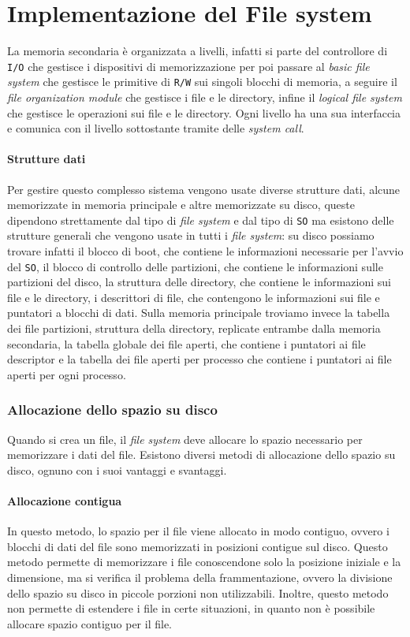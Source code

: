 \section{Implementazione del File system}
    La memoria secondaria è organizzata a livelli, infatti si parte del controllore di \texttt{I/O} che gestisce i dispositivi di memorizzazione per poi passare al \textit{basic file system} che gestisce le primitive di \texttt{R/W} sui singoli blocchi di memoria, a seguire il \textit{file organization module} che gestisce i file e le directory, infine il \textit{logical file system} che gestisce le operazioni sui file e le directory. Ogni livello ha una sua interfaccia e comunica con il livello sottostante tramite delle \textit{system call}. 
    \paragraph{Strutture dati}
        Per gestire questo complesso sistema vengono usate diverse strutture dati, alcune memorizzate in memoria principale e altre memorizzate su disco, queste dipendono strettamente dal tipo di \textit{file system} e dal tipo di \texttt{SO} ma esistono delle strutture generali che vengono usate in tutti i \textit{file system}: su disco possiamo trovare infatti il blocco di boot, che contiene le informazioni necessarie per l'avvio del \texttt{SO}, il blocco di controllo delle partizioni, che contiene le informazioni sulle partizioni del disco, la struttura delle directory, che contiene le informazioni sui file e le directory, i descrittori di file, che contengono le informazioni sui file e puntatori a blocchi di dati. Sulla memoria principale troviamo invece la tabella dei file partizioni, struttura della directory, replicate entrambe dalla memoria secondaria, la tabella globale dei file aperti, che contiene i puntatori ai file descriptor e la tabella dei file aperti per processo che contiene i puntatori ai file aperti per ogni processo.
    \subsubsection{Allocazione dello spazio su disco}
        Quando si crea un file, il \textit{file system} deve allocare lo spazio necessario per memorizzare i dati del file. Esistono diversi metodi di allocazione dello spazio su disco, ognuno con i suoi vantaggi e svantaggi.
        \paragraph{Allocazione contigua} In questo metodo, lo spazio per il file viene allocato in modo contiguo, ovvero i blocchi di dati del file sono memorizzati in posizioni contigue sul disco. Questo metodo permette di memorizzare i file conoscendone solo la posizione iniziale e la dimensione, ma si verifica il problema della frammentazione, ovvero la divisione dello spazio su disco in piccole porzioni non utilizzabili. Inoltre, questo metodo non permette di estendere i file in certe situazioni, in quanto non è possibile allocare spazio contiguo per il file.
